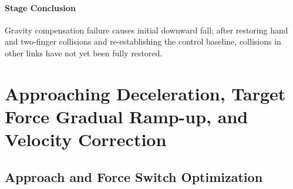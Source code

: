 

\paragraph{Stage Conclusion} Gravity compensation failure causes initial downward fall; after restoring hand and two-finger collisions and re-establishing the control baseline, collisions in other links have not yet been fully restored.


\FloatBarrier

\section{Approaching Deceleration, Target Force Gradual Ramp-up, and Velocity Correction}

\label{stage:s14}

\subsection{Approach and Force Switch Optimization}\label{s14-detail-1}

